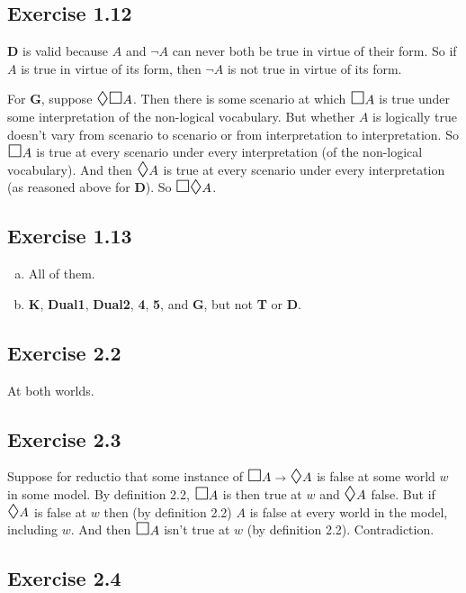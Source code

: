 \documentclass{scrartcl}
\let\oldbox\Box
\renewcommand\Box{\scaleobj{1.2}{\oldbox}}
\let\olddiamond\Diamond
\renewcommand\Diamond{\scaleobj{1.2}{\olddiamond}}
\let\oldto\to
\renewcommand\to{\scaleobj{0.95}{\,\oldto\,}}
\begin{document}
\subsection*{Exercise 1.12}

  \textbf{D} is valid because $A$ and $\neg A$ can never both be true
  in virtue of their form. So if $A$ is true in virtue of its form,
  then $\neg A$ is not true in virtue of its form.

  For \textbf{G}, suppose $\Diamond\Box A$. Then there is some
  scenario at which $\Box A$ is true under some interpretation of the
  non-logical vocabulary. But whether $A$ is logically true doesn't
  vary from scenario to scenario or from interpretation to
  interpretation. So $\Box A$ is true at every scenario under every
  interpretation (of the non-logical vocabulary). And then
  $\Diamond A$ is true at every scenario under every interpretation
  (as reasoned above for \textbf{D}). So $\Box\Diamond A$.


\subsection*{Exercise 1.13}

  \begin{enumerate}[(a)]
  \item All of them.
  \item \textbf{K}, \textbf{Dual1}, \textbf{Dual2}, \textbf{4},
    \textbf{5}, and \textbf{G}, but not \textbf{T} or \textbf{D}.
  \end{enumerate}

\subsection*{Exercise 2.2}

  At both worlds.

\subsection*{Exercise 2.3}

  Suppose for reductio that some instance of $\Box A \to \Diamond A$ is false at
  some world $w$ in some model. By definition 2.2, $\Box A$
  is then true at $w$ and $\Diamond A$ false. But if $\Diamond A$ is false at
  $w$ then (by definition 2.2) $A$ is false at every world
  in the model, including $w$. And then $\Box A$ isn't true at $w$ (by
  definition 2.2). Contradiction.

\subsection*{Exercise 2.4}
\end{document}
